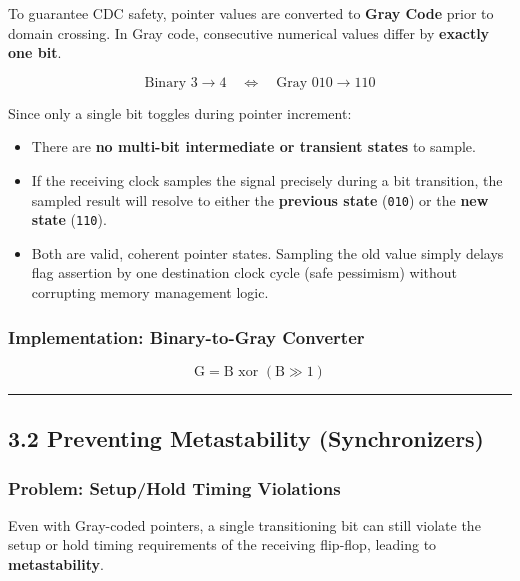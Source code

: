 \documentclass[
]{article}
\providecommand{\tightlist}{%
  \setlength{\itemsep}{0pt}\setlength{\parskip}{0pt}}
\begin{document}
To guarantee CDC safety, pointer values are converted to \textbf{Gray
Code} prior to domain crossing. In Gray code, consecutive numerical
values differ by \textbf{exactly one bit}.

\[\text{Binary } 3 \rightarrow 4 \quad \Longleftrightarrow \quad \text{Gray } 010 \rightarrow 110\]

Since only a single bit toggles during pointer increment:

\begin{itemize}
\tightlist
\item
  There are \textbf{no multi-bit intermediate or transient states} to
  sample.
\item
  If the receiving clock samples the signal precisely during a bit
  transition, the sampled result will resolve to either the
  \textbf{previous state} (\texttt{010}) or the \textbf{new state}
  (\texttt{110}).
\item
  Both are valid, coherent pointer states. Sampling the old value simply
  delays flag assertion by one destination clock cycle (safe pessimism)
  without corrupting memory management logic.
\end{itemize}

\subsubsection{Implementation: Binary-to-Gray
Converter}\label{implementation-binary-to-gray-converter}

\[\text{G} = \text{B} \text{ xor } (\text{B} \gg 1)\]

\begin{center}\rule{0.5\linewidth}{0.5pt}\end{center}

\subsection{3.2 Preventing Metastability
(Synchronizers)}\label{32-preventing-metastability-synchronizers}

\subsubsection{Problem: Setup/Hold Timing
Violations}\label{problem-setuphold-timing-violations}

Even with Gray-coded pointers, a single transitioning bit can still
violate the setup or hold timing requirements of the receiving
flip-flop, leading to \textbf{metastability}.
\end{document}
